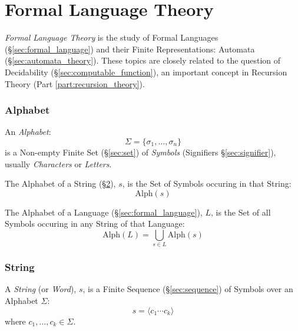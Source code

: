 \part{Formal Language Theory}\label{part:formal_language}
\cite{hammel03}

\emph{Formal Language Theory} is the study of Formal Languages
(\S\ref{sec:formal_language}) and their Finite Representations:
Automata (\S\ref{sec:automata_theory}). These topics are closely
related to the question of Decidability
(\S\ref{sec:computable_function}), an important concept in Recursion
Theory (Part \ref{part:recursion_theory}).



\section{Alphabet}\label{sec:alphabet}

An \emph{Alphabet}:
\[
  \Sigma = \{ \sigma_1, \ldots, \sigma_n \}
\]
is a Non-empty Finite Set (\S\ref{sec:set}) of \emph{Symbols}
(Signifiers \S\ref{sec:signifier}), usually \emph{Characters} or
\emph{Letters}.

The Alphabet of a String (\S\ref{sec:string}), $s$, is the Set of
Symbols occuring in that String:
\[
  \mathrm{Alph}(s)
\]

The Alphabet of a Language (\S\ref{sec:formal_language}), $L$, is the
Set of all Symbols occuring in any String of that Language:
\[
  \mathrm{Alph}(L) = \bigcup_{s \in L} \mathrm{Alph}(s)
\]



\section{String}\label{sec:string}

A \emph{String} (or \emph{Word}), $s$, is a Finite Sequence
(\S\ref{sec:sequence}) of Symbols over an Alphabet $\Sigma$:
\[
  s = \langle c_1 \cdots c_k \rangle
\]
where $c_1, \ldots, c_k \in \Sigma$.

